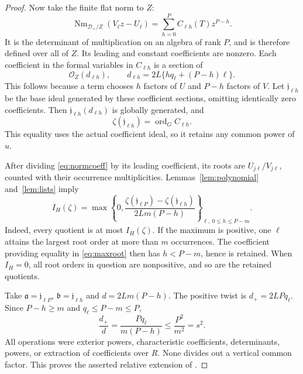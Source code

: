 \documentclass[11pt,reqno]{amsart}
\numberwithin{equation}{section}
\theoremstyle{definition}
\theoremstyle{remark}
\newcommand{\OO}{\mathcal O}
\newcommand{\ord}{\operatorname{ord}}
\newcommand{\Nm}{\operatorname{Nm}}
\newcommand{\cD}{\mathcal D}
\newcommand{\ba}{\mathfrak a}
\newcommand{\bb}{\mathfrak b}
\newcommand{\bj}{\mathfrak j}
\begin{document}
\begin{proof}
Now take the finite flat norm to $Z$:
\begin{equation}\label{eq:normcoeff}
 \Nm_{\cD_+/Z}(V_\ell z-U_\ell)
 =\sum_{h=0}^{P} C_{\ell h}(T)z^{P-h}.
\end{equation}
It is the determinant of multiplication on an algebra of rank $P$, and is therefore defined over all of $Z$. Its leading and constant coefficients are nonzero. Each coefficient in the formal variables in $C_{\ell h}$ is a section of
\begin{equation}\label{eq:twist}
 \OO_Z(d_{\ell h}),\qquad
 d_{\ell h}=2L\{hq_\ell+(P-h)\ell\}.
\end{equation}
This follows because a term chooses $h$ factors of $U$ and $P-h$ factors of $V$. Let $\bj_{\ell h}$ be the base ideal generated by these coefficient sections, omitting identically zero coefficients. Then $\bj_{\ell h}(d_{\ell h})$ is globally generated, and
\[
 \zeta(\bj_{\ell h})=\ord_G C_{\ell h}.
\]
This equality uses the actual coefficient ideal, so it retains any common power of $u$.

After dividing \eqref{eq:normcoeff} by its leading coefficient, its roots are $U_{j\ell}/V_{j\ell}$, counted with their occurrence multiplicities. Lemmas~\ref{lem:polynomial} and~\ref{lem:lists} imply
\begin{equation}\label{eq:retained}
 I_H(\zeta)=\max\left\{0,
 \frac{\zeta(\bj_{\ell P})-\zeta(\bj_{\ell h})}
 {2Lm(P-h)}\right\}_{\ell,\ 0\le h\le P-m}.
\end{equation}
Indeed, every quotient is at most $I_H(\zeta)$. If the maximum is positive, one $\ell$ attains the largest root order at more than $m$ occurrences. The coefficient providing equality in \eqref{eq:maxroot} then has $h<P-m$, hence is retained. When $I_H=0$, all root orders in question are nonpositive, and so are the retained quotients.

Take $\ba=\bj_{\ell P}$, $\bb=\bj_{\ell h}$ and $d=2Lm(P-h)$. The positive twist is $d_+=2LPq_\ell$. Since $P-h\ge m$ and $q_\ell\le P-m\le P$,
\[
 \frac{d_+}d=\frac{Pq_\ell}{m(P-h)}\le\frac{P^2}{m^2}=s^2.
\]
All operations were exterior powers, characteristic coefficients, determinants, powers, or extraction of coefficients over $R$. None divides out a vertical common factor. This proves the asserted relative extension of \cite[Proposition~4.3]{Jiao}.
\end{proof}
\end{document}
